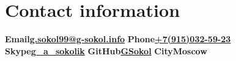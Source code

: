 \documentclass[9pt, a4paper, english]{extarticle}
\begin{document}
\section* {Contact information}
\textbf{Email}\textbf{\href{mailto:g.sokol99@g-sokol.info}{g.sokol99@g-sokol.info}}\newline
\textbf{Phone}\textbf{\href{tel:+7(915)032-59-23}{+7(915)032-59-23}}\newline
\textbf{Skype}\textbf{\href{skype:g\_a\_sokolik?call}{g\_a\_sokolik}}\newline
\textbf{GitHub}\textbf{\href{https://github.com/GSokol}{GSokol}}\newline
\textbf{City}\textbf{Moscow}
\end{document}
